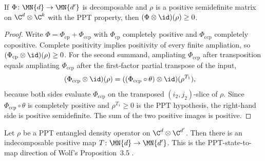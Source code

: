 \begin{theorem}
    \label{thm:decomposable_map_tensor_id_ppt}
    \leanok
    If $\Phi\colon\MN{d}\to\MN{d'}$ is decomposable and $\rho$ is a positive
    semidefinite matrix on $\C^{d}\otimes\C^{k}$ with the PPT property, then
    $(\Phi\otimes\id)(\rho)\ge0$.
\end{theorem}

\begin{proof}
    \leanok
    Write $\Phi=\Phi_{\mathrm{cp}}+\Phi_{\mathrm{ccp}}$ with
    $\Phi_{\mathrm{cp}}$ completely positive and $\Phi_{\mathrm{ccp}}$
    completely copositive. Complete positivity implies positivity of every
    finite ampliation, so
    $(\Phi_{\mathrm{cp}}\otimes\id)(\rho)\ge0$. For the second summand,
    ampliating $\Phi_{\mathrm{ccp}}$ after transposition equals ampliating $\Phi_{\mathrm{ccp}}$ after the first-factor partial transpose
    of the input,
    \begin{align}
        (\Phi_{\mathrm{ccp}}\otimes\id)(\rho)
         & =((\Phi_{\mathrm{ccp}}\circ\theta)\otimes\id)(\rho^{T_{1}}),
        \notag
    \end{align}
    because both sides evaluate $\Phi_{\mathrm{ccp}}$ on the transposed
    $(i_{2},j_{2})$-slice of $\rho$. Since $\Phi_{\mathrm{ccp}}\circ\theta$ is
    completely positive and $\rho^{T_{1}}\ge0$ is the PPT hypothesis, the
    right-hand side is positive semidefinite. The sum of the two positive
    images is positive.
\end{proof}

\begin{theorem}
    \label{thm:ppt_entangled_state_gives_indecomposable_map}
    \leanok
    Let $\rho$ be a PPT entangled density operator on
    $\C^d\otimes\C^{d'}$. Then there is an indecomposable positive map
    $T\colon\MN{d}\to\MN{d'}$.
    This is the PPT-state-to-map direction of Wolf's Proposition~3.5
    \cite[Chapter~3, Proposition~3.5]{Wolf2012Quantum}.
\end{theorem}

